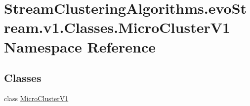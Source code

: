 \hypertarget{namespaceStreamClusteringAlgorithms_1_1evoStream_1_1v1_1_1Classes_1_1MicroClusterV1}{}\section{Stream\+Clustering\+Algorithms.\+evo\+Stream.\+v1.\+Classes.\+Micro\+Cluster\+V1 Namespace Reference}
\label{namespaceStreamClusteringAlgorithms_1_1evoStream_1_1v1_1_1Classes_1_1MicroClusterV1}
\subsection*{Classes}
\begin{DoxyCompactItemize}
\item 
class \hyperlink{classStreamClusteringAlgorithms_1_1evoStream_1_1v1_1_1Classes_1_1MicroClusterV1_1_1MicroClusterV1}{Micro\+Cluster\+V1}
\end{DoxyCompactItemize}
